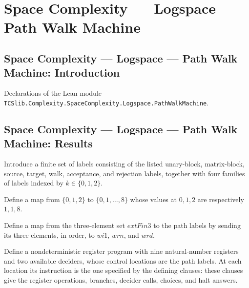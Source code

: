 \section{Space Complexity --- Logspace --- Path Walk Machine}
\subsection*{Space Complexity --- Logspace --- Path Walk Machine: Introduction}

Declarations of the Lean module \texttt{TCSlib.Complexity.SpaceComplexity.Logspace.PathWalkMachine}.

\subsection*{Space Complexity --- Logspace --- Path Walk Machine: Results}

\begin{definition}
\label{Complexity.LogProg.PathLabel}
\leanok
Introduce a finite set of labels consisting of the listed unary-block, matrix-block,
source, target, walk, acceptance, and rejection labels, together with four families of
labels indexed by $k\in\{0,1,2\}$.
\end{definition}

\begin{definition}
\label{Complexity.LogProg.akY}
\leanok
Define a map from $\{0,1,2\}$ to $\{0,1,\ldots,8\}$ whose values at $0,1,2$ are
respectively $1,1,8$.
\end{definition}

\begin{definition}
\label{Complexity.LogProg.akEx}
\leanok
{}
Define a map from the three-element set $	ext{Fin }3$ to the path labels by sending its
three elements, in order, to $wi1$, $wrn$, and $wrd$.
\end{definition}

\begin{definition}
\label{Complexity.LogProg.pathA}
\leanok
{}
Define a nondeterministic register program with nine natural-number registers and two
available deciders, whose control locations are the path labels. At each location its
instruction is the one specified by the defining clauses: these clauses give the
register operations, branches, decider calls, choices, and halt answers.
\end{definition}

